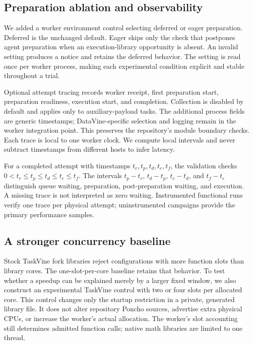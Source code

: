 \subsection{Preparation ablation and observability}
We added a worker environment control selecting deferred or eager preparation.
Deferred is the unchanged default. Eager skips only the check that postpones
agent preparation when an execution-library opportunity is absent. An invalid
setting produces a notice and retains the deferred behavior. The setting is
read once per worker process, making each experimental condition explicit and
stable throughout a trial.

Optional attempt tracing records worker receipt, first preparation start,
preparation readiness, execution start, and completion. Collection is disabled
by default and applies only to auxiliary-payload tasks. The additional process
fields are generic timestamps; DataVine-specific selection and logging remain
in the worker integration point. This preserves the repository's module
boundary checks. Each trace is local to one worker clock. We compute local
intervals and never subtract timestamps from different hosts to infer latency.

For a completed attempt with timestamps $t_r,t_p,t_d,t_e,t_f$, the validation
checks $0<t_r\leq t_p\leq t_d\leq t_e\leq t_f$. The intervals $t_p-t_r$,
$t_d-t_p$, $t_e-t_d$, and $t_f-t_e$ distinguish queue waiting, preparation,
post-preparation waiting, and execution. A missing trace is not interpreted as
zero waiting. Instrumented functional runs verify one trace per physical
attempt; uninstrumented campaigns provide the primary performance samples.

\subsection{A stronger concurrency baseline}
Stock TaskVine fork libraries reject configurations with more function slots
than library cores. The one-slot-per-core baseline retains that behavior.
To test whether a speedup can be explained merely by a larger fixed window,
we also construct an experimental TaskVine control with two or four slots per
allocated core. This control changes only the startup restriction in a private,
generated library file. It does not alter repository Poncho sources, advertise
extra physical CPUs, or increase the worker's actual allocation. The worker's
slot accounting still determines admitted function calls; native math libraries
are limited to one thread.

